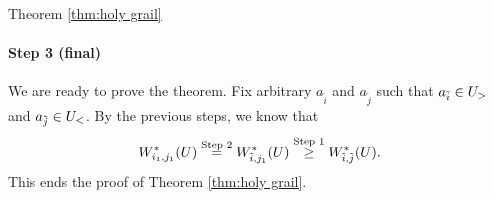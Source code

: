 \begin{proofof}{Theorem \ref{thm:holy grail}}
\paragraph{Step 3 (final)} We are ready to prove the theorem. Fix arbitrary $a_{\tilde i}$ and $a_{\tilde j}$ such that $a_{\tilde i} \in U_>$ and  $a_{\tilde j} \in U_<$. By the previous steps, we know that
\[
W^*_{{i_1},{j_1}}(U)\stackrel{\textnormal{Step 2}}{=}W^*_{{\tilde i},{j_1}}(U)\stackrel{\textnormal{Step 1}}{\geq}W^*_{{\tilde i},{\tilde j}}(U).
\]
This ends the proof of Theorem \ref{thm:holy grail}.
\end{proofof}

